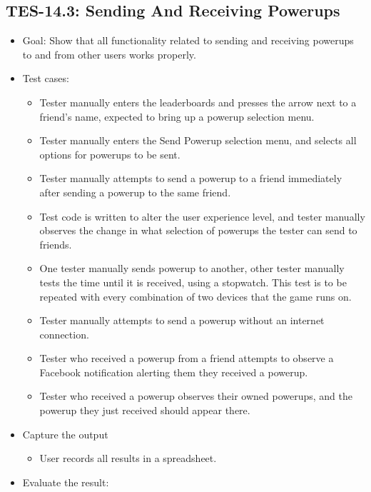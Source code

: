 \subsection{TES-14.3: Sending And Receiving Powerups }
\begin{itemize}
\item Goal: Show that all functionality related to sending and receiving powerups to and from other users works properly.
\item Test cases: 

\begin{itemize}

\item Tester manually enters the leaderboards and presses the arrow next to a friend's name, expected to bring up a powerup selection menu.
\item Tester manually enters the Send Powerup selection menu, and selects all options for powerups to be sent.
\item Tester manually attempts to send a powerup to a friend immediately after sending a powerup to the same friend.
\item Test code is written to alter the user experience level, and tester manually observes the change in what selection of powerups the tester can send to friends.
\item One tester manually sends powerup to another, other tester manually tests the time until it is received, using a stopwatch. This
test is to be repeated with every combination of two devices that the game runs on.
\item Tester manually attempts to send a powerup without an internet connection.
\item Tester who received a powerup from a friend attempts to observe a Facebook notification alerting them they received a powerup.
\item Tester who received a powerup observes their owned powerups, and the powerup they just received should appear there.


\end{itemize}
\item Capture the output 
\begin{itemize}
\item User records all results in a spreadsheet.
\end{itemize}
\item Evaluate the result: 


\end{itemize}
